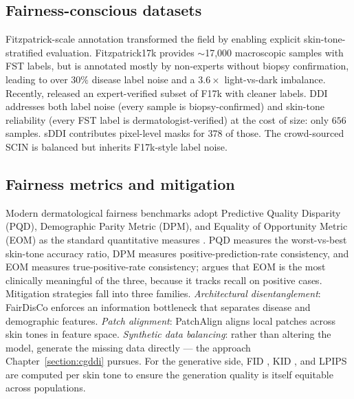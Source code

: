 \documentclass[11pt]{ucthesis}
\begin{document}
\subsection{Fairness-conscious datasets}

Fitzpatrick-scale annotation transformed the field by enabling explicit skin-tone-stratified evaluation. Fitzpatrick17k \cite{groh_2021_evaluating} provides $\sim$17{,}000 macroscopic samples with FST labels, but is annotated mostly by non-experts without biopsy confirmation, leading to over $30\%$ disease label noise \cite{groh_2021_evaluating} and a $3.6\times$ light-vs-dark imbalance. Recently, \cite{groh-2024} released an expert-verified subset of F17k with cleaner labels. DDI \cite{daneshjou_2022_disparities} addresses both label noise (every sample is biopsy-confirmed) and skin-tone reliability (every FST label is dermatologist-verified) at the cost of size: only $656$ samples. sDDI \cite{carrion-2023} contributes pixel-level masks for 378 of those. The crowd-sourced SCIN \cite{Jeong6186} is balanced but inherits F17k-style label noise.

\subsection{Fairness metrics and mitigation}

Modern dermatological fairness benchmarks adopt Predictive Quality Disparity (PQD), Demographic Parity Metric (DPM), and Equality of Opportunity Metric (EOM) as the standard quantitative measures \cite{du_2023_fairdisco,aayushman-2024,wu_2022_fairprune,rajkomar_2018_ensuring}. PQD measures the worst-vs-best skin-tone accuracy ratio, DPM measures positive-prediction-rate consistency, and EOM measures true-positive-rate consistency; \cite{aayushman-2024} argues that EOM is the most clinically meaningful of the three, because it tracks recall on positive cases. Mitigation strategies fall into three families. \emph{Architectural disentanglement}: FairDisCo \cite{du_2023_fairdisco} enforces an information bottleneck that separates disease and demographic features. \emph{Patch alignment}: PatchAlign \cite{aayushman-2024} aligns local patches across skin tones in feature space. \emph{Synthetic data balancing}: rather than altering the model, generate the missing data directly --- the approach Chapter~\ref{section:cgddi} pursues. For the generative side, FID \cite{heusel-2017}, KID \cite{binkowski-2018}, and LPIPS \cite{zhang2018perceptual} are computed per skin tone to ensure the generation quality is itself equitable across populations.
\end{document}
